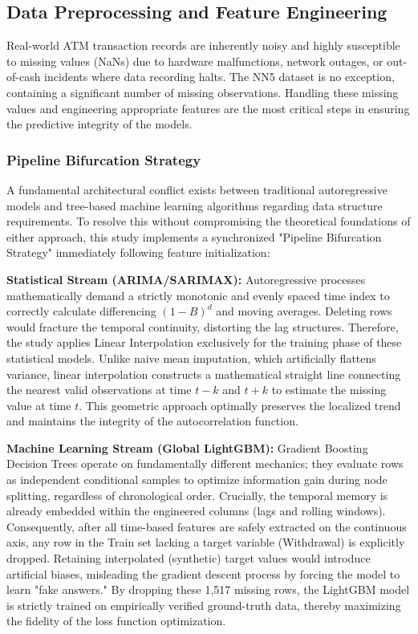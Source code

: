 \documentclass[conference, 12pt, onecolumn]{IEEEtran}
\begin{document}
\subsection{Data Preprocessing and Feature Engineering}

Real-world ATM transaction records are inherently noisy and highly susceptible to missing values (NaNs) due to hardware malfunctions, network outages, or out-of-cash incidents where data recording halts. The NN5 dataset is no exception, containing a significant number of missing observations. Handling these missing values and engineering appropriate features are the most critical steps in ensuring the predictive integrity of the models.

\subsubsection{Pipeline Bifurcation Strategy}
A fundamental architectural conflict exists between traditional autoregressive models and tree-based machine learning algorithms regarding data structure requirements. To resolve this without compromising the theoretical foundations of either approach, this study implements a synchronized "Pipeline Bifurcation Strategy" immediately following feature initialization:

\textbf{Statistical Stream (ARIMA/SARIMAX):} Autoregressive processes mathematically demand a strictly monotonic and evenly spaced time index to correctly calculate differencing $(1 - B)^d$ and moving averages. Deleting rows would fracture the temporal continuity, distorting the lag structures. Therefore, the study applies Linear Interpolation exclusively for the training phase of these statistical models. Unlike naive mean imputation, which artificially flattens variance, linear interpolation constructs a mathematical straight line connecting the nearest valid observations at time $t-k$ and $t+k$ to estimate the missing value at time $t$. This geometric approach optimally preserves the localized trend and maintains the integrity of the autocorrelation function.

\textbf{Machine Learning Stream (Global LightGBM):} Gradient Boosting Decision Trees operate on fundamentally different mechanics; they evaluate rows as independent conditional samples to optimize information gain during node splitting, regardless of chronological order. Crucially, the temporal memory is already embedded within the engineered columns (lags and rolling windows). Consequently, after all time-based features are safely extracted on the continuous axis, any row in the Train set lacking a target variable (Withdrawal) is explicitly dropped. Retaining interpolated (synthetic) target values would introduce artificial biases, misleading the gradient descent process by forcing the model to learn "fake answers." By dropping these 1,517 missing rows, the LightGBM model is strictly trained on empirically verified ground-truth data, thereby maximizing the fidelity of the loss function optimization.
\end{document}
